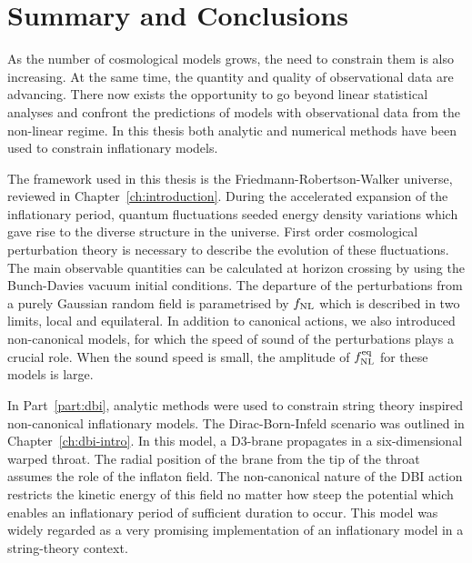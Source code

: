 \renewcommand{\CVSrevision}%
{\version$Id: theend.tex,v 1.12 2009/11/12 23:43:06 ith Exp $}

\chapter{Summary and Conclusions}
\label{ch:conclusions}

As the number of cosmological models grows, the need to constrain them is also
increasing. At the same time, the quantity and quality of observational data are
advancing. There now exists the opportunity to go beyond linear statistical analyses
and confront the predictions of models with observational data from the non-linear
regime. In this thesis both analytic and numerical methods have been used to
constrain inflationary models.

The framework used in this thesis is the Friedmann-Robertson-Walker universe,
reviewed in Chapter~\ref{ch:introduction}. During the accelerated expansion of the
inflationary period, quantum fluctuations seeded energy density variations which
gave rise to the diverse structure in the universe. First order
cosmological perturbation theory
is necessary to describe the evolution of these fluctuations. The main observable
quantities can be calculated at horizon crossing by using the Bunch-Davies vacuum
initial conditions. The departure of the perturbations from a purely Gaussian random
field is parametrised by $f_{\mathrm{NL}}$ which is described in two limits, local and
equilateral. 
In addition to canonical actions, we also introduced
non-canonical models, for which the speed of sound of the perturbations plays a
crucial role. When the sound speed is small, the amplitude of $f_{\mathrm{NL}}^{\mathrm{eq}}$ for these
models is large. 



In Part~\ref{part:dbi}, analytic methods were used to constrain
string theory inspired non-canonical inflationary models. The Dirac-Born-Infeld
scenario was
outlined in Chapter~\ref{ch:dbi-intro}. In this model, a D3-brane propagates in a
six-dimensional warped throat. The radial position of the brane from the tip of the
throat assumes the role of the inflaton field. The non-canonical nature of the DBI
action restricts the kinetic energy of this field no matter how steep the potential
which enables an inflationary period of sufficient duration to occur.
This model was widely regarded as a very promising implementation of an inflationary
model in a string-theory context.

